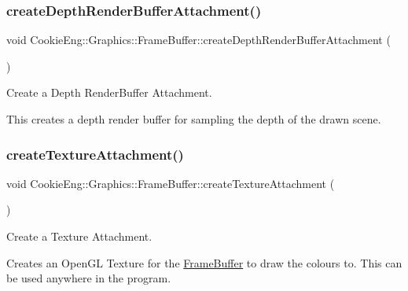 \subsubsection{\texorpdfstring{create\+Depth\+Render\+Buffer\+Attachment()}{createDepthRenderBufferAttachment()}}
{\footnotesize\ttfamily void Cookie\+Eng\+::\+Graphics\+::\+Frame\+Buffer\+::create\+Depth\+Render\+Buffer\+Attachment (\begin{DoxyParamCaption}{ }\end{DoxyParamCaption})\hspace{0.3cm}{\ttfamily [protected]}}



Create a Depth Render\+Buffer Attachment. 

This creates a depth render buffer for sampling the depth of the drawn scene. \mbox{\label{class_cookie_eng_1_1_graphics_1_1_frame_buffer_a7ebc5f799dddcaa97bf514b06d110cb1}} 
\subsubsection{\texorpdfstring{create\+Texture\+Attachment()}{createTextureAttachment()}}
{\footnotesize\ttfamily void Cookie\+Eng\+::\+Graphics\+::\+Frame\+Buffer\+::create\+Texture\+Attachment (\begin{DoxyParamCaption}{ }\end{DoxyParamCaption})\hspace{0.3cm}{\ttfamily [protected]}}



Create a Texture Attachment. 

Creates an Open\+GL Texture for the \hyperlink{class_cookie_eng_1_1_graphics_1_1_frame_buffer}{Frame\+Buffer} to draw the colours to. This can be used anywhere in the program. \mbox{\label{class_cookie_eng_1_1_graphics_1_1_frame_buffer_ad206df318f47af664391600585249171}} 
